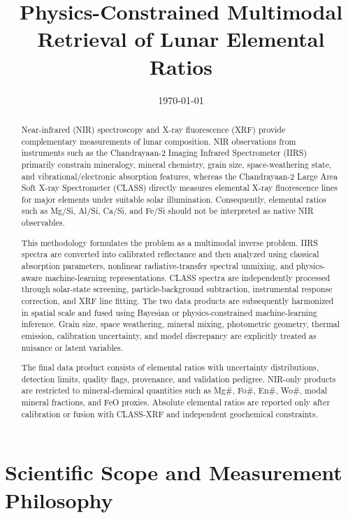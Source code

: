 \documentclass[11pt,a4paper]{article}
\title{\textbf{Physics-Constrained Multimodal Retrieval of Lunar Elemental Ratios}\\
}
\author{}
\date{\today}
\begin{document}
\maketitle

\begin{abstract}
Near-infrared (NIR) spectroscopy and X-ray fluorescence (XRF) provide complementary measurements of lunar composition. NIR observations from instruments such as the Chandrayaan-2 Imaging Infrared Spectrometer (IIRS) primarily constrain mineralogy, mineral chemistry, grain size, space-weathering state, and vibrational/electronic absorption features, whereas the Chandrayaan-2 Large Area Soft X-ray Spectrometer (CLASS) directly measures elemental X-ray fluorescence lines for major elements under suitable solar illumination. Consequently, elemental ratios such as Mg/Si, Al/Si, Ca/Si, and Fe/Si should not be interpreted as native NIR observables.

This methodology formulates the problem as a multimodal inverse problem. IIRS spectra are converted into calibrated reflectance and then analyzed using classical absorption parameters, nonlinear radiative-transfer spectral unmixing, and physics-aware machine-learning representations. CLASS spectra are independently processed through solar-state screening, particle-background subtraction, instrumental response correction, and XRF line fitting. The two data products are subsequently harmonized in spatial scale and fused using Bayesian or physics-constrained machine-learning inference. Grain size, space weathering, mineral mixing, photometric geometry, thermal emission, calibration uncertainty, and model discrepancy are explicitly treated as nuisance or latent variables.

The final data product consists of elemental ratios with uncertainty distributions, detection limits, quality flags, provenance, and validation pedigree. NIR-only products are restricted to mineral-chemical quantities such as Mg\#, Fo\#, En\#, Wo\#, modal mineral fractions, and FeO proxies. Absolute elemental ratios are reported only after calibration or fusion with CLASS-XRF and independent geochemical constraints.
\end{abstract}

\tableofcontents
\newpage

\section{Scientific Scope and Measurement Philosophy}
\end{document}
